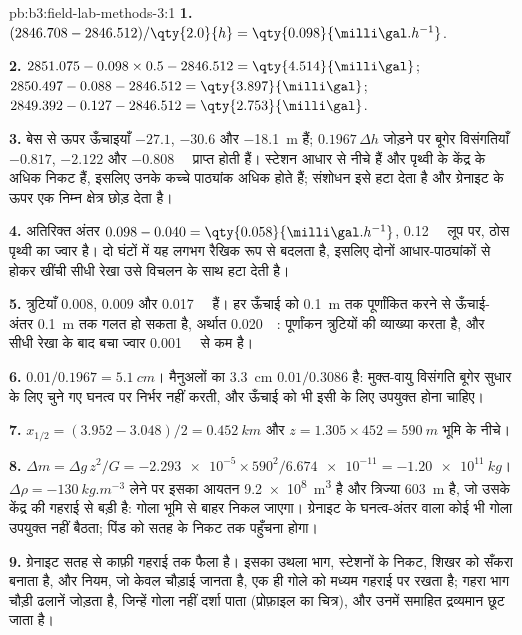 \begin{solution}{pb:b3:field-lab-methods-3:1}
\textbf{1.} $(2846.708 - 2846.512)/\qty{2.0}{h} = \qty{0.098}{\milli\gal.h^{-1}}$.

\textbf{2.} $2851.075 - 0.098\times0.5 - 2846.512 = \qty{4.514}{\milli\gal}$;
$2850.497 - 0.088 - 2846.512 = \qty{3.897}{\milli\gal}$;
$2849.392 - 0.127 - 2846.512 = \qty{2.753}{\milli\gal}$.

\textbf{3.} बेस से ऊपर ऊँचाइयाँ $-27.1$, $-30.6$ और
\qty{-18.1}{m} हैं; $0.1967\,\Delta h$ जोड़ने पर बूगेर विसंगतियाँ
$\num{-0.817}$, $\num{-2.122}$ और \qty{-0.808}{\milli\gal} प्राप्त होती हैं।
स्टेशन आधार से नीचे हैं और पृथ्वी के केंद्र के अधिक निकट हैं,
इसलिए उनके कच्चे पाठ्यांक अधिक होते हैं; संशोधन इसे हटा देता है
और ग्रेनाइट के ऊपर एक निम्न क्षेत्र छोड़ देता है।

\textbf{4.} अतिरिक्त अंतर $0.098 - 0.040 = \qty{0.058}{\milli\gal.h^{-1}}$,
\qty{0.12}{\milli\gal} लूप पर, ठोस पृथ्वी का ज्वार है। दो
घंटों में यह लगभग रैखिक रूप से बदलता है, इसलिए दोनों आधार-पाठ्यांकों से होकर खींची सीधी रेखा
उसे विचलन के साथ हटा देती है।

\textbf{5.} त्रुटियाँ $\num{0.008}$, $\num{0.009}$ और
\qty{0.017}{\milli\gal} हैं। हर ऊँचाई को \qty{0.1}{m} तक पूर्णांकित करने से
ऊँचाई-अंतर \qty{0.1}{m} तक गलत हो सकता है, अर्थात
\qty{0.020}{\milli\gal}: पूर्णांकन त्रुटियों की व्याख्या करता है, और
सीधी रेखा के बाद बचा ज्वार \qty{0.001}{\milli\gal} से कम है।

\textbf{6.} $0.01/0.1967 = \qty{5.1}{cm}$। मैनुअलों का \qty{3.3}{cm}
$0.01/0.3086$ है: मुक्त-वायु विसंगति बूगेर सुधार के लिए चुने गए घनत्व पर
निर्भर नहीं करती, और ऊँचाई को भी इसी के लिए उपयुक्त होना चाहिए।

\textbf{7.} $x_{1/2} = (3.952 - 3.048)/2 = \qty{0.452}{km}$ और $z = 1.305
\times452 = \qty{590}{m}$ भूमि के नीचे।

\textbf{8.} $\Delta m = \Delta g\,z^2/G = \num{-2.293e-5}\times590^2/
\num{6.674e-11} = \qty{-1.20e11}{kg}$। $\Delta\rho =
\qty{-130}{kg.m^{-3}}$ लेने पर इसका आयतन \qty{9.2e8}{m^3} है और त्रिज्या
\qty{603}{m} है, जो उसके केंद्र की गहराई से बड़ी है: गोला भूमि से
बाहर निकल जाएगा। ग्रेनाइट के घनत्व-अंतर वाला कोई भी गोला
उपयुक्त नहीं बैठता; पिंड को सतह के निकट तक पहुँचना होगा।

\textbf{9.} ग्रेनाइट सतह से काफ़ी गहराई तक फैला है। इसका उथला
भाग, स्टेशनों के निकट, शिखर को सँकरा बनाता है, और नियम, जो
केवल चौड़ाई जानता है, एक ही गोले को मध्यम गहराई पर रखता है;
गहरा भाग चौड़ी ढलानें जोड़ता है, जिन्हें गोला नहीं दर्शा पाता (प्रोफ़ाइल का चित्र),
और उनमें समाहित द्रव्यमान छूट जाता है।


\end{solution}
